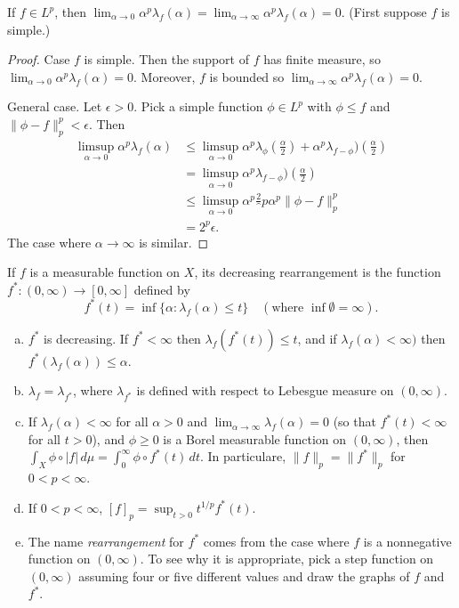 \documentclass{article}
\begin{document}
 If $f \in L^p$, then $\lim_{\alpha \to 0} \alpha^p \lambda_f(\alpha) = \lim_{\alpha \to \infty} \alpha^p \lambda_f(\alpha) = 0$. (First suppose $f$ is simple.)
\begin{proof}
Case $f$ is simple.  Then the support of $f$ has finite measure, so $\lim_{\alpha \to 0} \alpha^p \lambda_f(\alpha) = 0$.  Moreover, $f$ is bounded so $\lim_{\alpha \to \infty} \alpha^p \lambda_f(\alpha) = 0$.

General case. Let $\epsilon > 0$. Pick a simple function $\phi \in L^p$ with  $\phi \le f$ and $\|\phi - f\|_p^p < \epsilon$.  Then
\begin{align*}
\limsup_{\alpha \to 0} \alpha^p \lambda_f(\alpha) & \le \limsup_{\alpha \to 0} \alpha^p \lambda_\phi(\frac \alpha 2) + \alpha^p \lambda_{f - \phi})(\frac \alpha 2)
\\ & = \limsup_{\alpha \to 0} \alpha^p \lambda_{f - \phi})(\frac \alpha 2)
\\ & \le \limsup_{\alpha \to 0} \alpha^p \frac 2^p {\alpha^p} \|\phi - f\|_p^p
\\ & = 2^p \epsilon.
\end{align*}
The case where $\alpha \to \infty$ is similar.
\end{proof}

 If $f$ is a measurable function on $X$, its decreasing rearrangement is the function $f^*: (0,\infty) \to [0,\infty]$ defined by 
$$f^*(t) = \inf\{\alpha : \lambda_f(\alpha) \le t\} \quad (\text{where } \inf \emptyset = \infty).$$
\begin{enumerate}[a.]
\item $f^*$ is decreasing. If $f^* < \infty$ then $\lambda_f(f^*(t)) \le t$, and if $\lambda_f(\alpha) < \infty)$ then $f^*(\lambda_f(\alpha)) \le \alpha$.
\item $\lambda_f = \lambda_{f^*}$, where $\lambda_{f^*}$ is defined with respect to Lebesgue measure on $(0,\infty)$.
\item If $\lambda_f(\alpha) < \infty$ for all $\alpha > 0$ and $\lim_{\alpha \to \infty} \lambda_f(\alpha) = 0$ (so that $f^*(t) < \infty$ for all $t > 0$), and 
$\phi \ge 0$ is a Borel measurable function on $(0,\infty)$, then $\int_X \phi \circ |f| \, d\mu = \int_0^\infty \phi \circ f^*(t) \, dt$. In particulare,
$\|f\|_p = \|f^*\|_p$ for $0 < p < \infty$.
\item If $0<p < \infty$, $[f]_p = \sup_{t > 0} t^{1/p} f^*(t)$.
\item The name \emph{rearrangement} for $f^*$ comes from the case where $f$ is a nonnegative function on $(0,\infty)$. To see why it is appropriate, pick
a step function on $(0, \infty)$ assuming four or five different values and draw the graphs of $f$ and $f^*$.
\end{enumerate}
\end{document}
